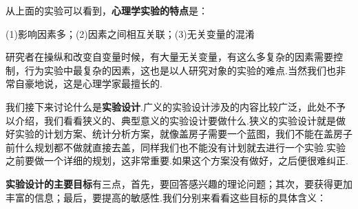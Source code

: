 从上面的实验可以看到，\textbf{心理学实验的特点}是：

(1)影响因素多；(2)因素之间相互关联；(3)无关变量的混淆

研究者在操纵和改变自变量时候，有大量无关变量，有这么多复杂的因素需要控制，行为实验中最复杂的因素，这也是以人研究对象的实验的难点.当然我们也非常自豪地说，这是心理学家最擅长的.

我们接下来讨论什么是\textbf{实验设计}.广义的实验设计涉及的内容比较广泛，此处不予以介绍，我们看看狭义的、典型意义的实验设计要做什么.狭义的实验设计就是做好实验的计划方案、统计分析方案，就像盖房子需要一个蓝图，我们不能在盖房子前什么规划都不做就直接去盖，同样我们也不能没有计划就去进行一个实验.实验之前要做一个详细的规划，这非常重要.如果这个方案没有做好，之后便很难纠正.

\textbf{实验设计的主要目标}有三点，首先，要回答感兴趣的理论问题；其次，要获得更加丰富的信息；最后，要提高的敏感性.我们分别来看看这些目标的具体含义：

